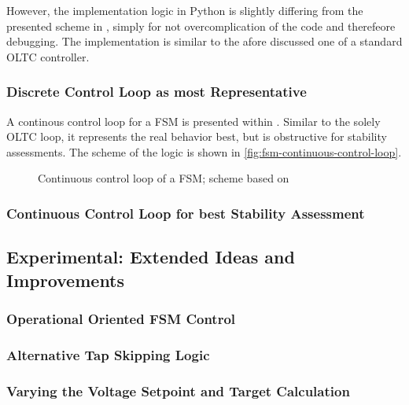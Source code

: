 However, the implementation logic in Python is slightly differing from the presented scheme in \autocite{burlakinEnhancedVoltageControl2024}, simply for not overcomplication of the code and therefeore debugging. The implementation is similar to the afore discussed one of a standard \acs{OLTC} controller. 


\subsubsection{Discrete Control Loop as most Representative}
A continous control loop for a \acs{FSM} is presented within \textcite{burlakinEnhancedVoltageControl2024,burlakinEnhancingVariableShunt2024}. Similar to the solely \acs{OLTC} loop, it represents the real behavior best, but is obstructive for stability assessments. The scheme of the logic is shown in \autoref{fig:fsm-continuous-control-loop}.

\begin{figure}[htb!]
        \centering
        \caption{Continuous control loop of a \acs{FSM}; scheme based on \textcite{burlakinEnhancedVoltageControl2024}}
        \label{fig:fsm-continuous-control-loop}
\end{figure}

\subsubsection{Continuous Control Loop for best Stability Assessment}

\subsection{Experimental: Extended Ideas and Improvements}

\subsubsection{Operational Oriented FSM Control}

\subsubsection{Alternative Tap Skipping Logic}

\subsubsection{Varying the Voltage Setpoint and Target Calculation}


